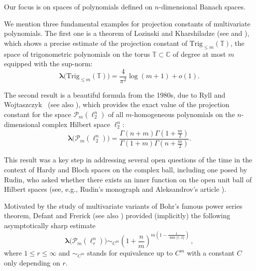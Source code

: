 \documentclass[12pt]{amsart}
\numberwithin{subsection}{section}
\theoremstyle{definition}
\theoremstyle{remark}
\begin{document}
Our focus is on spaces of  polynomials defined on $n$-dimensional Banach spaces.

We  mention three fundamental examples for projection constants of multivariate polynomials.
The first one is a theorem of  Lozinski and Kharshiladze (see \cite[IIIB. Theorem 22]{wojtaszczyk1996banach} and
\cite{natanson1961constructive}), which shows a  precise estimate of the projection constant of $\text{Trig}_{\leq m}(\mathbb{T})$,
the space of trigonometric polynomials on the torus $\mathbb{T} \subset \mathbb{C}$ of degree at most $m$ equipped with the sup-norm:
\begin{equation} \label{LoKa}
\boldsymbol{\lambda}\big(\text{Trig}_{\leq m}(\mathbb{T})\big)= \frac{4}{\pi^2} \log(m+1) + o(1).
\end{equation}

The second result is a beautiful formula from the 1980s, due to Ryll and Wojtaszczyk~\cite{ryll1983homogeneous} (see also
\cite[IIIB. Theorem 15]{wojtaszczyk1996banach}), which provides the exact value of the projection constant for the space
$\mathcal{P}_{m}(\ell^n_2)$ of all $m$-homogeneous polynomials on the $n$-dimensional complex Hilbert space $\ell_2^n$:
\begin{equation} \label{RWRW}
\boldsymbol{\lambda}\big(\mathcal{P}_{m}(\ell^n_2)\big) = \frac{\Gamma(n+m) \Gamma(1+\frac{m}{2})}{\Gamma(1+m)\Gamma(n+\frac{m}{2})}.
\end{equation}


This result was a key step in addressing several open questions of the time in the context of Hardy and Bloch spaces on the complex ball, including one posed by Rudin, who asked whether there exists an inner function on the open unit ball of Hilbert spaces (see, e.g.,  Rudin's monograph \cite{rudin1980} and Aleksandrov's article \cite{aleksandrov1984inner}).

Motivated by the study of multivariate variants of Bohr's famous power series theorem,  Defant and Frerick
\cite{defant2011bohr} (see also \cite[Section 22.2]{defant2019libro}) provided (implicitly) the following asymptotically sharp estimate
\begin{equation}\label{eq:proj const pols on lp}
\boldsymbol{\lambda}\big(\mathcal P_m(\ell_r^n)\big)  \sim_{C^m} \left( 1+\frac{n}{m} \right)^{m\left(1-\frac{1}{\min\{r,2\}}\right)}\,,
\end{equation}
where $1 \leq r \leq \infty$ and $\sim_{C^m}$ stands for equivalence up to $C^m$ with a constant $C$ only depending on $r$.
\end{document}
